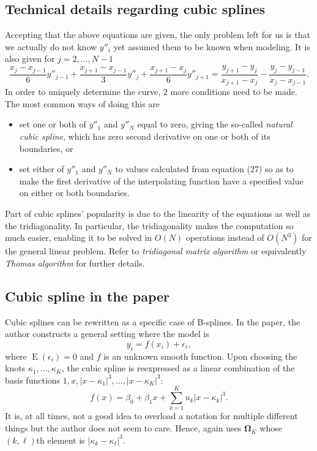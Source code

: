\documentclass[11pt]{article}
\newcommand{\bs}{\boldsymbol}
\newcommand{\opn}{\operatorname}
\begin{document}
 \subsection{Technical details regarding cubic splines}
 Accepting that the above equations are given, the only problem left for us is that we actually do not know $y''_{i}$ yet assumed them to be known when modeling. It is also given for $j=2, \ldots , N-1$
 \begin{equation}
  \frac{x_{j}-x_{j-1}}{6}y''_{j-1} + \frac{x_{j+1}-x_{j-1}}{3}y''_{j} + \frac{x_{j+1}-x_{j}}{6}y''_{j+1} = \frac{y_{j+1}-y_{j}}{x_{j+1}-x_{j}} - \frac{y_{j}-y_{j-1}}{x_{j}-x_{j-1}}.
 \end{equation}
 In order to uniquely determine the curve, 2 more conditions need to be made. The most common ways of doing this are
 \begin{itemize}
  \item set one or both of $y''_{1}$ and $y''_{N}$ equal to zero, giving the so-called \emph{natural cubic spline}, which has zero second derivative on one or both of its boundaries, or
  \item set either of $y''_{1}$ and $y''_{N}$ to values calculated from equation (27) so as to make the first derivative of the interpolating function have a specified value on either or both boundaries.
 \end{itemize}
Part of cubic splines' popularity is due to the linearity of the equations as well as the tridiagonality. In particular, the tridiagonality makes the computation so much easier, enabling it to be solved in $O\left(N\right)$ operations instead of $O\left(N^{3}\right)$ for the general linear problem. Refer to \emph{tridiagonal matrix algorithm} or equivalently \emph{Thomas algorithm} for further details.
\subsection{Cubic spline in the paper}
Cubic splines can be rewritten as a specific case of B-splines. In the paper, the author constructs a general setting where the model is
\begin{equation}
  y_{i} = f\left(x_{i}\right) + \epsilon_{i},
\end{equation}
where $\opn{E}\left(\epsilon_{i}\right) = 0$ and $f$ is an unknown smooth function. Upon choosing the knots $\kappa_{1}, \ldots , \kappa_{K}$, the cubic spline is reexpressed as a linear combination of the basis functions $1, x, \left|x-\kappa_{1}\right|^{3}, \ldots , \left|x-\kappa_{K}\right|^{3}$:
\begin{equation}
  f\left(x\right) = \beta_{0} + \beta_{1}x + \sum_{k=1}^{K}u_{k}\left|x-\kappa_{k}\right|^{3}.
\end{equation}
It is, at all times, not a good idea to overload a notation for multiple different things but the author does not seem to care. Hence, again uses $\bs{\Omega}_{K}$ whose $\left(k,\ell\right)$th element is $\left|\kappa_{k}-\kappa_{\ell}\right|^{3}$.
\end{document}

